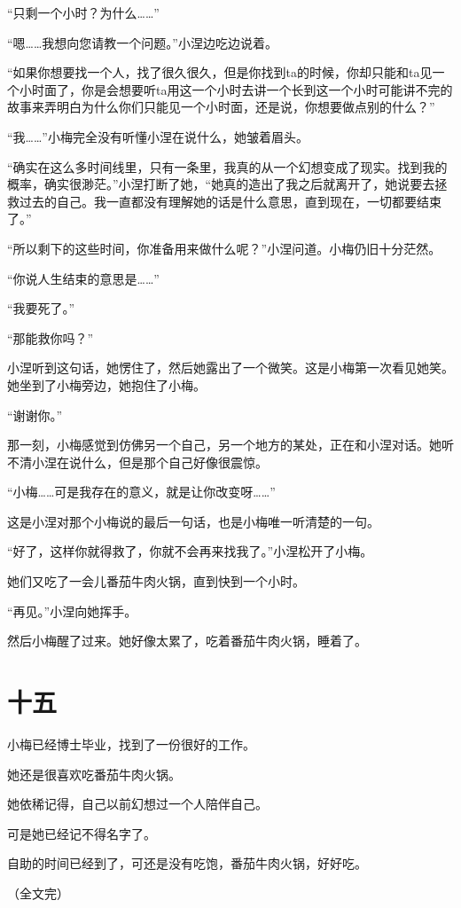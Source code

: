 \documentclass[12pt,a4paper]{ctexart}
\begin{document}
“只剩一个小时？为什么……”

“嗯……我想向您请教一个问题。”小涅边吃边说着。

“如果你想要找一个人，找了很久很久，但是你找到ta的时候，你却只能和ta见一个小时面了，你是会想要听ta用这一个小时去讲一个长到这一个小时可能讲不完的故事来弄明白为什么你们只能见一个小时面，还是说，你想要做点别的什么？”

“我……”小梅完全没有听懂小涅在说什么，她皱着眉头。

“确实在这么多时间线里，只有一条里，我真的从一个幻想变成了现实。找到我的概率，确实很渺茫。”小涅打断了她，“她真的造出了我之后就离开了，她说要去拯救过去的自己。我一直都没有理解她的话是什么意思，直到现在，一切都要结束了。”

“所以剩下的这些时间，你准备用来做什么呢？”小涅问道。小梅仍旧十分茫然。

“你说人生结束的意思是……”

“我要死了。”

“那能救你吗？”

小涅听到这句话，她愣住了，然后她露出了一个微笑。这是小梅第一次看见她笑。她坐到了小梅旁边，她抱住了小梅。

“谢谢你。”

那一刻，小梅感觉到仿佛另一个自己，另一个地方的某处，正在和小涅对话。她听不清小涅在说什么，但是那个自己好像很震惊。

“小梅……可是我存在的意义，就是让你改变呀……”

这是小涅对那个小梅说的最后一句话，也是小梅唯一听清楚的一句。

“好了，这样你就得救了，你就不会再来找我了。”小涅松开了小梅。

她们又吃了一会儿番茄牛肉火锅，直到快到一个小时。

“再见。”小涅向她挥手。

然后小梅醒了过来。她好像太累了，吃着番茄牛肉火锅，睡着了。

\section{十五}

小梅已经博士毕业，找到了一份很好的工作。

她还是很喜欢吃番茄牛肉火锅。

她依稀记得，自己以前幻想过一个人陪伴自己。

可是她已经记不得名字了。

\vspace{2em}

自助的时间已经到了，可还是没有吃饱，番茄牛肉火锅，好好吃。

（全文完）
\end{document}
